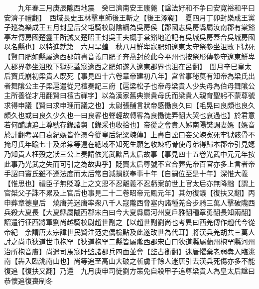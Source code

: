 　　九年春三月庚辰隴西地震　癸巳濟南安王康薨【諡法好和不争曰安寛裕和平曰安濟子禮翻】　西域長史玉林擊車師後王斬之【後王涿鞮】　夏四月丁卯封樂成王黨子廵為樂成王五月封皇后父屯騎校尉隂綱為吳房侯【郡國志吳房縣屬汝南郡有棠谿亭左傳房國楚靈王所滅又楚昭王封吳王夫概于棠谿地道記有吳城吳房蓋合吳城房國以名縣也】以特進就第　六月旱蝗　秋八月鮮卑寇肥如遼東太守祭參坐沮敗下獄死【賢曰肥如縣屬遼西郡前書音義曰肥子奔燕封於此今平州也按祭彤傳參守遼東鮮卑入郡界參坐沮敗下獄死蓋寇遼西之肥如遂入遼東郡界也沮在呂翻】　閏月辛巳皇太后竇氏崩初梁貴人既死【事見四十六卷章帝建初八年】宫省事秘莫有知帝為梁氏出者舞隂公主子梁扈遣從兄襢奏記三府【扈梁松子也帝母梁貴人少失母為伯母舞隂公主所養從才用翻賢曰襢古禪字】以為漢家舊典崇貴母氏而梁貴人親育聖躬不蒙尊號求得申議【賢曰求申理而議之也】太尉張酺言狀帝感慟良久曰【毛晃曰良頗也良久頗久也或曰良久少久也一曰良畧也聲輕故轉畧為良慟徒弄翻大哭也哀過也】於君意若何酺請追上尊號存錄諸舅【錄采也收拾也】帝從之會貴人姊南陽樊調妻嫕【嫕音於計翻考異曰袁紀嫕皆作憑今從皇后紀梁竦傳】上書自訟曰妾父竦寃死牢獄骸骨不掩母氏年踰七十及弟棠等遠在絶域不知死生願乞收竦朽骨使母弟得歸本郡帝引見嫕乃知貴人枉殁之狀三公上奏請依光武黜呂太后故事【事見四十五卷光武中元元年按此事乃光武之失而可引之為故典乎】貶竇太后尊號不宜合葬先帝百官亦多上言者帝手詔曰竇氏雖不遵法度而太后常自減損朕奉事十年【自嗣位至是十年】深惟大義【惟思也】禮臣子無貶尊上之文恩不忍離義不忍虧案前世上官太后亦無降黜【謂上官桀父子誅不累及上官后也事見二十二卷昭帝元鳳元年】其勿復議【復扶又翻】丙申葬章德皇后　燒唐羌迷唐率衆八千人寇隴西脅塞内諸種羌合步騎三萬人擊破隴西兵殺大夏長【大夏縣屬隴西郡宋白曰今大夏縣屬河州夏戶雅翻種章勇翻長知兩翻】詔遣行征西將軍劉尚越騎校尉趙世副之【以趙世副劉尚也考異曰西羌傳作趙代今從帝紀　余謂唐太宗諱世民賢注范史偶檢點及此遂改世為代耳】將漢兵羌胡共三萬人討之尚屯狄道世屯枹罕【狄道枹罕二縣皆屬隴西郡宋白曰狄道縣屬蘭州枹罕縣河州治所枹音膚】尚遣司馬寇盱監諸郡兵四面並會【監古銜翻】迷唐懼棄老弱犇入臨洮南【犇入臨洮南山也】尚等追至高山大破之斬虜千餘人迷唐引去漢兵死傷亦多不能復追【復扶又翻】乃還　九月庚申司徒劉方策免自殺甲子追尊梁貴人為皇太后諡曰恭懷追復喪制冬

